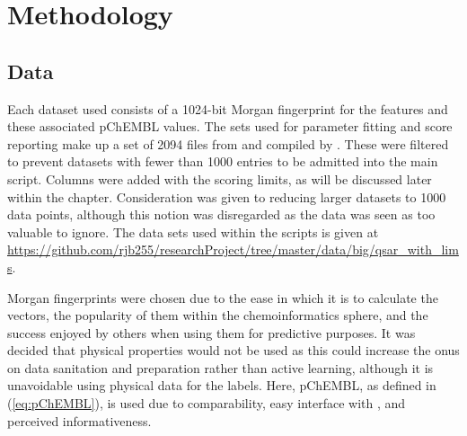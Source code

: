\chapter{Methodology}
\label{ch:method}

\graphicspath{{Chapter3/Figs/Vector/}{Chapter3/Figs/}}

\section{Data}
Each dataset used consists of a 1024-bit Morgan fingerprint for the features and these associated pChEMBL values. The sets used for parameter fitting and score reporting make up a set of 2094 files from \textcite{CHEMBL} and compiled by \textcite{king18}. These were filtered to prevent datasets with fewer than 1000 entries to be admitted into the main script. Columns were added with the scoring limits, as will be discussed later within the chapter. Consideration was given to reducing larger datasets to 1000 data points, although this notion was disregarded as the data was seen as too valuable to ignore. The data sets used within the scripts is given at \url{https://github.com/rjb255/researchProject/tree/master/data/big/qsar_with_lims}.

Morgan fingerprints were chosen due to the ease in which it is to calculate the vectors, the popularity of them within the chemoinformatics sphere, and the success enjoyed by others when using them for predictive purposes. It was decided that physical properties would not be used as this could increase the onus on data sanitation and preparation rather than active learning, although it is unavoidable using physical data for the labels. Here, pChEMBL, as defined in (\ref{eq:pChEMBL}), is used due to comparability, easy interface with \textcite{CHEMBL}, and perceived informativeness.

